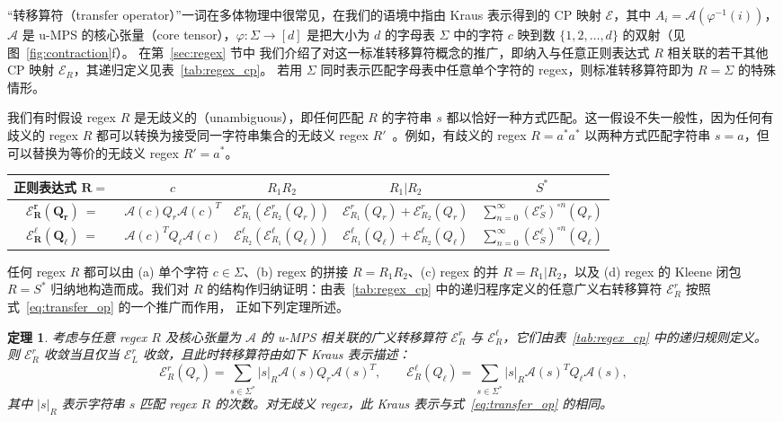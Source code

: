 \documentclass[twoside]{article}
\newtheorem{theorem}{定理}
\newcommand{\E}{\mc{E}}
\newcommand{\EL}{\mc{E}^{\scriptstyle \ell}}
\newcommand{\ER}{\mc{E}^{\scriptstyle r}}
\newcommand{\QL}{Q_{\ell}}
\newcommand{\QR}{Q_{r}}
\newcommand{\sR}{|s|_R}
\newcommand{\mc}[1]{\mathcal{#1}}
\begin{document}
``转移算符（transfer operator）''一词在多体物理中很常见，在我们的语境中指由 Kraus 表示得到的 CP 映射 $\E$，其中 $A_i = \mc{A}(\varphi^{-1}(i))$，$\mc{A}$ 是 u-MPS 的核心张量（core tensor），$\varphi: \Sigma \to [d]$ 是把大小为 $d$ 的字母表 $\Sigma$ 中的字符 $c$ 映到数 $\{1, 2, \ldots, d\}$ 的双射（见图~\ref{fig:contraction}f）。
在第~\ref{sec:regex} 节中
我们介绍了对这一标准转移算符概念的推广，即纳入与任意正则表达式 $R$ 相关联的若干其他 CP 映射 $\E_R$，其递归定义见表~\ref{tab:regex_cp}。
若用 $\Sigma$ 同时表示匹配字母表中任意单个字符的 regex，则标准转移算符即为 $R = \Sigma$ 的特殊情形。

我们有时假设 regex $R$ 是无歧义的（unambiguous），即任何匹配 $R$ 的字符串 $s$ 都以恰好一种方式匹配。这一假设不失一般性，因为任何有歧义的 regex $R$ 都可以转换为接受同一字符串集合的无歧义 regex $R'$~\citep{book1971}。例如，有歧义的 regex $R = a^*a^*$ 以两种方式匹配字符串 $s = a$，但可以替换为等价的无歧义 regex $R' = a^*$。
%
\begin{table}[t]
\begin{center}
\begin{small}
\begin{sc}
\begin{tabular}{c|cccc}
    \textbf{正则表达式} $\mathbf{R =\ }$ & $c$ & $R_1 R_2$ & $R_1 | R_2$ & $S^*$ \\
    \midrule
    $\bm{\ER_R(\QR)}\ = $ & $\mc{A}(c) \QR \mc{A}(c)^T$ & $\ER_{R_1}(\ER_{R_2}(\QR))$ & $\ER_{R_1}(\QR) + \ER_{R_2}(\QR)$ & $\sum_{n=0}^\infty (\ER_S)^{\circ n}(\QR)$ \\
    $\bm{\EL_R(\QL)}\ = $ & $\mc{A}(c)^T \QL \mc{A}(c)$ & $\EL_{R_2}(\EL_{R_1}(\QL))$ & $\EL_{R_1}(\QL) + \EL_{R_2}(\QL)$ & $\sum_{n=0}^\infty (\EL_S)^{\circ n}(\QL)$
\end{tabular}
\end{sc}
\end{small}
\end{center}
\vskip -0.1in
\end{table}

任何 regex $R$ 都可以由 (a) 单个字符 $c\in\Sigma$、(b) regex 的拼接 $R = R_1 R_2$、(c) regex 的并 $R = R_1 | R_2$，以及 (d) regex 的 Kleene 闭包 $R = S^*$ 归纳地构造而成。我们对 $R$ 的结构作归纳证明：由表~\ref{tab:regex_cp} 中的递归程序定义的任意广义右转移算符 $\ER_R$
按照式~\ref{eq:transfer_op} 的一个推广而作用，
正如下列定理所述。

\begin{theorem}
\label{thm:transfer_op}
考虑与任意 regex $R$ 及核心张量为 $\mc{A}$ 的 u-MPS 相关联的广义转移算符 $\ER_R$ 与 $\EL_R$，它们由表~\ref{tab:regex_cp} 中的递归规则定义。
则 $\ER_R$ 收敛当且仅当 $\ER_L$ 收敛，且此时转移算符由如下 Kraus 表示描述：
\begin{equation}
\label{eq:gen_transfer_op}
\ER_R(\QR) = \sum_{s\in \Sigma^*} \sR \mc{A}(s) \QR \mc{A}(s)^T, \qquad \EL_R(\QL) = \sum_{s\in \Sigma^*} \sR \mc{A}(s)^T \QL \mc{A}(s),
\end{equation}
其中 $\sR$ 表示字符串 $s$ 匹配 regex $R$ 的次数。对无歧义 regex，此 Kraus 表示与式~\eqref{eq:transfer_op} 的相同。
\end{theorem}
\end{document}
